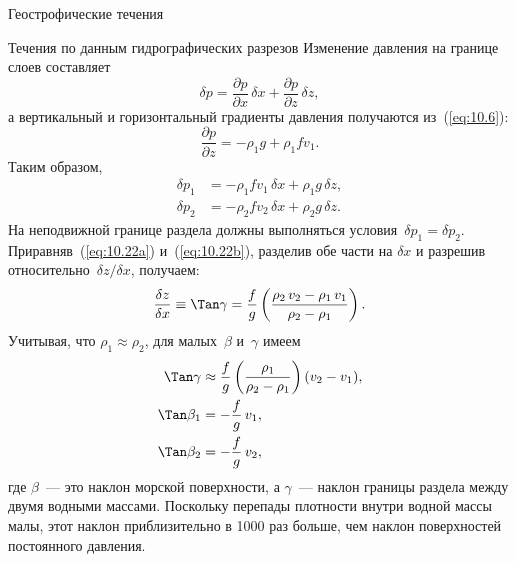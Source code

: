 \begin{chapter}{Геострофические течения}
\begin{section}{Течения по данным гидрографических разрезов}
Изменение давления на границе слоев составляет 
\begin{equation}
\delta p = \frac{\partial p}{\partial x}\,\delta x 
           + \frac{\partial p}{\partial z}\, \delta z,
\end{equation}
а вертикальный и горизонтальный градиенты давления получаются 
из~(\ref{eq:10.6}):
\begin{equation}
\frac{\partial p}{\partial z}= - \rho_1 g + \rho_1 f v_1.
\end{equation}
Таким образом,
\begin{subequations}
\begin{align}
 \delta p_1&=-\rho_1fv_1 \, \delta x + \rho_1 g \, \delta z, \label{eq:10.22a}\\
 \delta p_2&=-\rho_2fv_2 \, \delta x + \rho_2 g \, \delta z. \label{eq:10.22b}
\end{align}
\end {subequations}
На неподвижной границе раздела должны выполняться 
условия~$\delta p_1 = \delta p_2$. 
Приравняв~(\ref{eq:10.22a}) и~(\ref{eq:10.22b}), 
разделив обе части на $\delta x$ и разрешив
относительно~$\delta z/\delta x$, получаем:
\begin{displaymath}
\frac{\delta z}{\delta x}\equiv \Tan \gamma 
  =\frac{f}{g}\left(\frac{\rho_2\,v_2 - \rho_1\,v_1}{\rho_2 -\rho_1}\right).
\end{displaymath}
Учитывая, что $\rho_1 \approx \rho_2$, для малых~$\beta$ и~$\gamma$ имеем 
\begin{subequations}
\begin{align}
 \Tan \gamma &\approx \frac{f}{g}\left(\frac{\rho_1}{\rho_2 - \rho_1}\right)(v_2-v_1), \\
\Tan \beta_1&=-\frac{f}{g}\, v_1, \\
\Tan \beta_2&=-\frac{f}{g}\, v_2,
\end{align}
\end {subequations}
где $\beta$~--- это наклон морской поверхности, а $\gamma$~--- наклон
границы раздела между двумя водными массами. Поскольку перепады
плотности внутри водной массы малы, этот наклон приблизительно в 1000
раз больше, чем наклон поверхностей постоянного давления.
%

\end{section}
\end{chapter}
